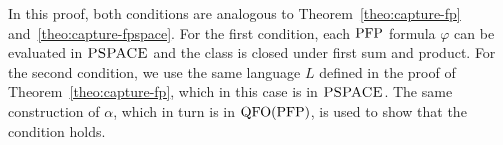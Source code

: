 In this proof, both conditions are analogous to Theorem~\ref{theo:capture-fp} and~\ref{theo:capture-fpspace}. For the first condition, each ${\rm PFP}$ formula $\varphi$ can be evaluated in $\text{\sc PSPACE}$ and the class is closed under first sum and product. For the second condition, we use the same language $L$ defined in the proof of Theorem~\ref{theo:capture-fp}, which in this case is in $\text{\sc PSPACE}$. The same construction of $\alpha$, which in turn is in ${\rm QFO}({\rm PFP})$, is used to show that the condition holds.
